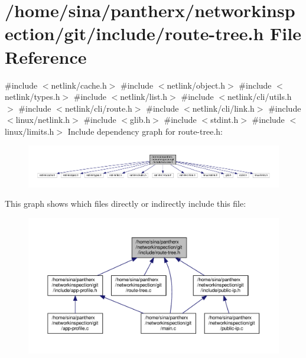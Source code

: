 \hypertarget{route-tree_8h}{}\section{/home/sina/pantherx/networkinspection/git/include/route-\/tree.h File Reference}
\label{route-tree_8h}
{\ttfamily \#include $<$netlink/cache.\+h$>$}\newline
{\ttfamily \#include $<$netlink/object.\+h$>$}\newline
{\ttfamily \#include $<$netlink/types.\+h$>$}\newline
{\ttfamily \#include $<$netlink/list.\+h$>$}\newline
{\ttfamily \#include $<$netlink/cli/utils.\+h$>$}\newline
{\ttfamily \#include $<$netlink/cli/route.\+h$>$}\newline
{\ttfamily \#include $<$netlink/cli/link.\+h$>$}\newline
{\ttfamily \#include $<$linux/netlink.\+h$>$}\newline
{\ttfamily \#include $<$glib.\+h$>$}\newline
{\ttfamily \#include $<$stdint.\+h$>$}\newline
{\ttfamily \#include $<$linux/limits.\+h$>$}\newline
Include dependency graph for route-\/tree.h\+:\nopagebreak
\begin{figure}[H]
\begin{center}
\leavevmode
\includegraphics[width=350pt]{route-tree_8h__incl}
\end{center}
\end{figure}
This graph shows which files directly or indirectly include this file\+:\nopagebreak
\begin{figure}[H]
\begin{center}
\leavevmode
\includegraphics[width=350pt]{route-tree_8h__dep__incl}
\end{center}
\end{figure}
